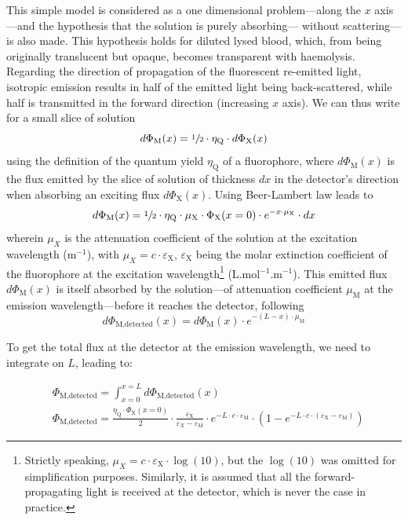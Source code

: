 This simple model is considered as a one dimensional problem---along the $x$ axis---and the hypothesis that the solution is purely absorbing---\ie{} without scattering---is also made. This hypothesis holds for diluted lysed blood, which, from being originally translucent but opaque, becomes transparent with haemolysis. Regarding the direction of propagation of the fluorescent re-emitted light, isotropic emission results in half of the emitted light being back-scattered, while half is transmitted in the forward direction (increasing $x$ axis). We can thus write for a small slice of solution
\begin{equation}\label{anneq:fluo_quenching:quantum_yield}
	d\Phi_\text{M}(x)=\sfrac{1}{2} \cdot \eta_\text{Q} \cdot d\Phi_\text{X}(x)
\end{equation}
using the definition of the quantum yield $\eta_\text{Q}$ of a fluorophore\cite{bigio2016}, where $d\Phi_\text{M}(x)$ is the flux emitted by the slice of solution of thickness $dx$ in the detector's direction when absorbing an exciting flux $d\Phi_\text{X}(x)$. Using Beer-Lambert law leads to
\begin{equation}\label{anneq:fluo_quenching:beer_fluo}
	d\Phi_\text{M}(x) = \sfrac{1}{2} \cdot \eta_\text{Q} \cdot \mu_\text{X} \cdot \Phi_\text{X}(x=0) \cdot e^{-x \cdot \mu_\text{X}} \cdot dx
\end{equation}
wherein $\mu_X$ is the attenuation coefficient of the solution at the excitation wavelength (m$^{-1}$), with $\mu_X=c \cdot \varepsilon_\text{X}$, $\varepsilon_\text{X}$ being the molar extinction coefficient of the fluorophore at the excitation wavelength\footnote{Strictly speaking, $\mu_X=c \cdot \varepsilon_\text{X} \cdot \log(10)$, but the $\log(10)$ was omitted for simplification purposes. Similarly, it is assumed that all the forward-propagating light is received at the detector, which is never the case in practice.} (L.mol$^{-1}$.m$^{-1}$). This emitted flux $d\Phi_\text{M}(x)$ is itself absorbed by the solution---of attenuation coefficient $\mu_\text{M}$ at the emission wavelength---before it reaches the detector, following
\begin{equation}
	d\Phi_\text{M,detected}(x) = d\Phi_\text{M}(x) \cdot e^{-(L-x) \cdot \mu_\text{M}}
\end{equation}

To get the total flux at the detector at the emission wavelength, we need to integrate on $L$, leading to:

\begin{equation}
	\begin{split}
		&\Phi_\text{M,detected} = \int_{x=0}^{x=L} d\Phi_\text{M,detected}(x) \\
		&\Phi_\text{M,detected} = \frac{\eta_\text{Q} \cdot \Phi_\text{X}(x=0)}{2} \cdot \frac{\varepsilon_\text{X} }{\varepsilon_X - \varepsilon_\text{M}} \cdot e^{-L\cdot c \cdot \varepsilon_\text{M}} \cdot \left(1-e^{-L\cdot c \cdot (\varepsilon_\text{X} - \varepsilon_\text{M})}\right)
	\end{split}
\end{equation}

